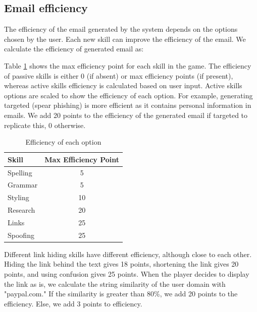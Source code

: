 \subsection{Email efficiency}
The efficiency of the email generated by the system depends on the options chosen by the user. Each new skill can improve the efficiency of the email. We calculate the efficiency of generated email as:

\begin{center}
\end{center}

Table \ref*{tab:efficiency} shows the max efficiency point for each skill in the game. The efficiency of passive skills is either 0 (if absent) or max efficiency points (if present), whereas active skills efficiency is calculated based on user input. Active skills options are scaled to show the efficiency of each option. For example, generating targeted (spear phishing) is more efficient as it contains personal information in emails. We add 20 points to the efficiency of the generated email if targeted to replicate this, 0 otherwise.

\begin{table}[!ht]
    \centering
    \begin{tabular}{l c}
        \hline
        Skill    & Max Efficiency Point \\
        \hline
        Spelling & 5                    \\
        Grammar  & 5                    \\
        Styling  & 10                   \\
        Research & 20                   \\
        Links    & 25                   \\
        Spoofing & 25                   \\
        \hline
    \end{tabular}%
    \caption{Efficiency of each option}
    \label{tab:efficiency}
\end{table}

Different link hiding skills have different efficiency, although close to each other. Hiding the link behind the text gives 18 points, shortening the link gives 20 points, and using confusion gives 25 points. When the player decides to display the link as is, we calculate the string similarity of the user domain with "paypal.com." If the similarity is greater than 80\%, we add 20 points to the efficiency. Else, we add 3 points to efficiency.

